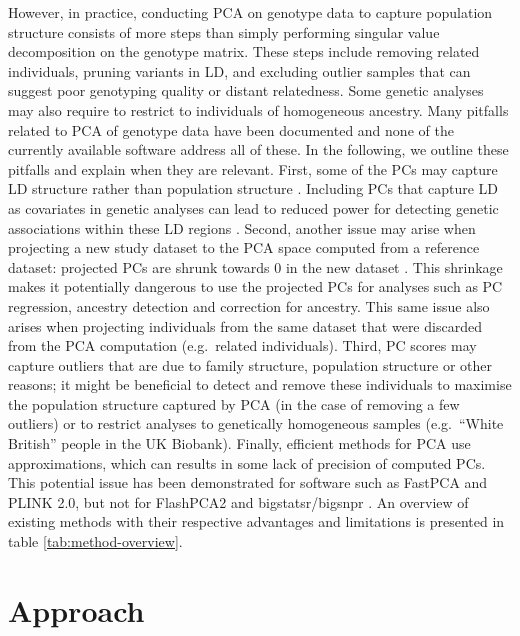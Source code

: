 \documentclass{bioinfo}
\begin{document}
However, in practice, conducting PCA on genotype data to capture population structure consists of more steps than simply performing singular value decomposition on the genotype matrix. These steps include removing related individuals, pruning variants in LD, and excluding outlier samples that can suggest poor genotyping quality or distant relatedness. 
Some genetic analyses may also require to restrict to individuals of homogeneous ancestry.
Many pitfalls related to PCA of genotype data have been documented and none of the currently available software address all of these. 
In the following, we outline these pitfalls and explain when they are relevant.
First, some of the PCs may capture LD structure rather than population structure \cite[]{price2008long,zou2010quantification,abdellaoui2013population,prive2017efficient}.
Including PCs that capture LD as covariates in genetic analyses can lead to reduced power for detecting genetic associations within these LD regions \cite[]{zou2010quantification}.  
Second, another issue may arise when projecting a new study dataset to the PCA space computed from a reference dataset: projected PCs are shrunk towards 0 in the new dataset \cite[]{lee2010convergence,wang2015improved,zhang2019fast}. This shrinkage makes it potentially dangerous to use the projected PCs for analyses such as PC regression, ancestry detection and correction for ancestry.
This same issue also arises when projecting individuals from the same dataset that were discarded from the PCA computation (e.g.\ related individuals).
Third, PC scores may capture outliers that are due to family structure, population structure or other reasons; it might be beneficial to detect and remove these individuals to maximise the population structure captured by PCA (in the case of removing a few outliers) or to restrict analyses to genetically homogeneous samples (e.g.\ ``White British'' people in the UK Biobank).
Finally, efficient methods for PCA use approximations, which can results in some lack of precision of computed PCs. This potential issue has been demonstrated for software such as FastPCA and PLINK 2.0, but not for FlashPCA2 and bigstatsr/bigsnpr \cite[]{abraham2017flashpca2,prive2017efficient}.
An overview of existing methods with their respective advantages and limitations is presented in table \ref{tab:method-overview}.

\section{Approach}
\end{document}
